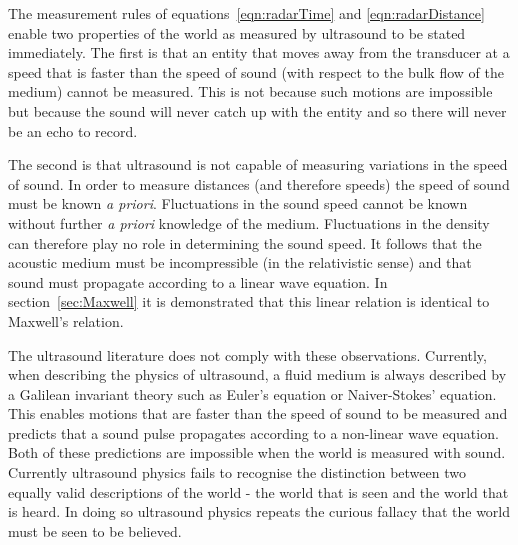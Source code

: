 \documentclass[10pt, fleqn,final,showtrims,oldfontcommands, article,a4paper,oneside]{memoir} %
\newcommand{\secref}[1]{section~\ref{sec:#1}}
\begin{document}
The measurement rules of equations~\ref{eqn:radarTime} and \ref{eqn:radarDistance} enable two properties of the world as measured by ultrasound to be stated immediately.
The first is that an entity that moves away from the transducer at a speed that is faster than the speed of sound (with respect to the bulk flow of the medium) 
cannot be measured.  
This is not because such motions are impossible but because the sound will never catch  up with the entity and so there will never be an echo to record.

The second is that ultrasound is not capable of  measuring variations in the speed of sound.
In order to measure distances (and therefore speeds) the speed of sound must be known {\em a priori}.
Fluctuations in the sound speed  cannot be known without further {\em a priori} knowledge of the medium. 
Fluctuations in the density  can therefore play no role in determining the sound speed. %
It follows that the acoustic medium must be incompressible (in the relativistic sense\cite{Pekeris1976, Pekeris1977, Taub1978})
and that  sound must propagate according to a linear wave equation. %
In \secref{Maxwell} it is demonstrated that this linear relation is identical to Maxwell's relation.

The ultrasound literature does not comply with these observations.
Currently, when describing the physics of ultrasound, a fluid medium is always described by a Galilean invariant theory such as Euler's equation or Naiver-Stokes' equation.
This enables motions that are faster than the speed of sound to be measured 
and predicts that  a sound pulse  propagates according to  a non-linear wave equation.
Both of these predictions are impossible when the world is measured with sound.
%
Currently ultrasound physics fails to recognise the distinction between  two equally valid descriptions of the world -
the world that is seen
and the world that is heard.
In doing so ultrasound physics repeats the curious  fallacy that  the world must be seen to be believed.
\end{document}
